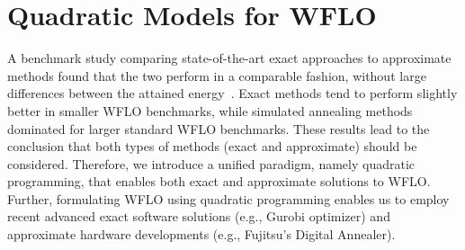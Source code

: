 \documentclass[preprint,12pt]{elsarticle}
\begin{document}
%
%
%
%
%
%


\section{Quadratic Models for WFLO}
\label{sec:QUBO4WFLO}

A benchmark study comparing state-of-the-art exact approaches \cite{Zhang2014} to 
approximate methods found that the two perform in a comparable fashion, without large differences between
the attained energy~\cite{yang2019simulated}. Exact methods tend to perform slightly better
in smaller WFLO benchmarks, while simulated annealing methods dominated for larger standard WFLO benchmarks. 
These results lead to the conclusion that both types of methods (exact and approximate) should be considered. Therefore, we introduce a unified paradigm, namely quadratic programming, that enables
both exact and approximate solutions to WFLO. Further, formulating WFLO using quadratic programming enables us to employ 
recent advanced exact software solutions (e.g., Gurobi optimizer) and approximate hardware developments 
(e.g., Fujitsu's Digital Annealer).


\end{document}
